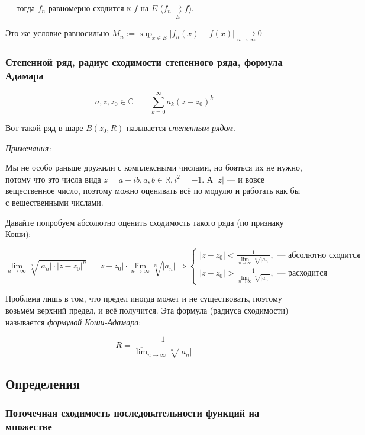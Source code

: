 \documentclass{article}
\def\rsh#1{\underset{#1}{\rightrightarrows}}
\def\rshe{\rsh{E}}
\begin{document}
--- тогда $f_n$ равномерно сходится к $f$ на $E$ ($f_n \rshe f$).

Это же условие равносильно $M_n := \sup_{x \in E} |f_n(x) - f(x)| \underset{n \rightarrow \infty}{\rightarrow} 0 $

\subsubsection{Степенной ряд, радиус сходимости степенного ряда, формула Адамара}

\[a, z, z_0 \in \mathbb{C} \qquad \sum_{k = 0}^{\infty} a_k (z - z_0)^k\]

Вот такой ряд в шаре $B(z_0, R)$ называется \textit{степенным рядом}. 

\textit{Примечания: }

Мы не особо раньше дружили с комплексными числами, но бояться их не нужно, потому что это числа вида $z = a + ib, a, b \in \mathbb{R}, i^2 = -1$. А $|z|$ --- и вовсе вещественное число, поэтому можно оценивать всё по модулю и работать как бы с вещественными числами.

Давайте попробуем абсолютно оценить сходимость такого ряда (по признаку Коши): 

\[\lim_{n \rightarrow \infty}{\sqrt[n]{|a_n| \cdot |z - z_0|^n}} = |z - z_0| \cdot \lim_{n \rightarrow \infty}\sqrt[n]{|a_n|} \Rightarrow \begin{cases}
    |z - z_0| < \frac{1}{\lim_{n \rightarrow \infty}\sqrt[n]{|a_n|}}, \text{ --- абсолютно сходится} \\
    |z - z_0| > \frac{1}{\lim_{n \rightarrow \infty}\sqrt[n]{|a_n|}}, \text{ --- расходится}
\end{cases}\]

Проблема лишь в том, что предел иногда может и не существовать, поэтому возьмём верхний предел, и всё получится. Эта формула (радиуса сходимости) называется \textit{формулой Коши-Адамара}:

\[R = \frac{1}{ \overline{\lim}_{n \rightarrow \infty}\sqrt[n]{|a_n|}}\]

\newpage

\subsection{Определения}

\subsubsection{Поточечная сходимость последовательности функций на множестве}
\end{document}
